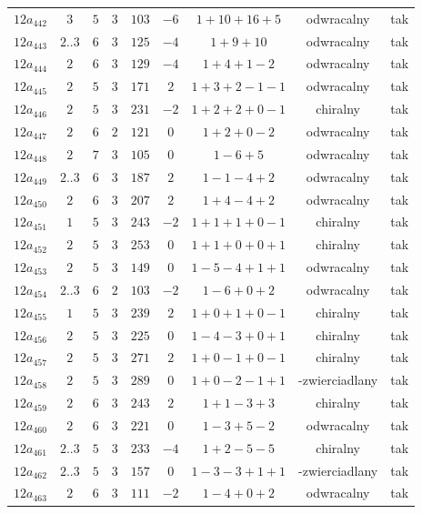 \begin{longtable}{ccccccccc}
$12a_{442}$ & $3$ & $5$ & $3$ & $103$ & $-6$ & $1+10+16+5$ & odwracalny & tak \\
$12a_{443}$ & $2..3$ & $6$ & $3$ & $125$ & $-4$ & $1+9+10$ & odwracalny & tak \\
$12a_{444}$ & $2$ & $6$ & $3$ & $129$ & $-4$ & $1+4+1-2$ & odwracalny & tak \\
$12a_{445}$ & $2$ & $5$ & $3$ & $171$ & $2$ & $1+3+2-1-1$ & odwracalny & tak \\
$12a_{446}$ & $2$ & $5$ & $3$ & $231$ & $-2$ & $1+2+2+0-1$ & chiralny & tak \\
$12a_{447}$ & $2$ & $6$ & $2$ & $121$ & $0$ & $1+2+0-2$ & odwracalny & tak \\
$12a_{448}$ & $2$ & $7$ & $3$ & $105$ & $0$ & $1-6+5$ & odwracalny & tak \\
$12a_{449}$ & $2..3$ & $6$ & $3$ & $187$ & $2$ & $1-1-4+2$ & odwracalny & tak \\
$12a_{450}$ & $2$ & $6$ & $3$ & $207$ & $2$ & $1+4-4+2$ & odwracalny & tak \\
$12a_{451}$ & $1$ & $5$ & $3$ & $243$ & $-2$ & $1+1+1+0-1$ & chiralny & tak \\
$12a_{452}$ & $2$ & $5$ & $3$ & $253$ & $0$ & $1+1+0+0+1$ & chiralny & tak \\
$12a_{453}$ & $2$ & $5$ & $3$ & $149$ & $0$ & $1-5-4+1+1$ & odwracalny & tak \\
$12a_{454}$ & $2..3$ & $6$ & $2$ & $103$ & $-2$ & $1-6+0+2$ & odwracalny & tak \\
$12a_{455}$ & $1$ & $5$ & $3$ & $239$ & $2$ & $1+0+1+0-1$ & chiralny & tak \\
$12a_{456}$ & $2$ & $5$ & $3$ & $225$ & $0$ & $1-4-3+0+1$ & chiralny & tak \\
$12a_{457}$ & $2$ & $5$ & $3$ & $271$ & $2$ & $1+0-1+0-1$ & chiralny & tak \\
$12a_{458}$ & $2$ & $5$ & $3$ & $289$ & $0$ & $1+0-2-1+1$ & -zwierciadlany & tak \\
$12a_{459}$ & $2$ & $6$ & $3$ & $243$ & $2$ & $1+1-3+3$ & chiralny & tak \\
$12a_{460}$ & $2$ & $6$ & $3$ & $221$ & $0$ & $1-3+5-2$ & odwracalny & tak \\
$12a_{461}$ & $2..3$ & $5$ & $3$ & $233$ & $-4$ & $1+2-5-5$ & chiralny & tak \\
$12a_{462}$ & $2..3$ & $5$ & $3$ & $157$ & $0$ & $1-3-3+1+1$ & -zwierciadlany & tak \\
$12a_{463}$ & $2$ & $6$ & $3$ & $111$ & $-2$ & $1-4+0+2$ & odwracalny & tak \\

\end{longtable}
